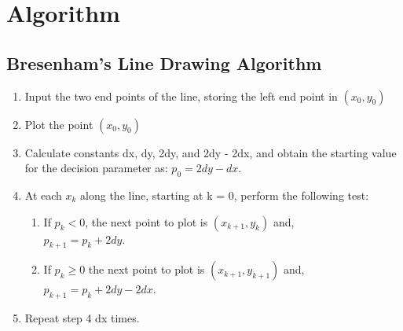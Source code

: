 \documentclass[12pt]{article}
\begin{document}
	\section{Algorithm}
	\subsection{Bresenham's Line Drawing Algorithm}
	\begin{enumerate}
		\item Input the two end points of the line, storing the left end point in $(x_0, y_0)$ 
		\item Plot the point $(x_0, y_0)$
		\item Calculate constants dx, dy, 2dy, and 2dy - 2dx, and obtain the starting value for the decision parameter as: $p_0 = 2dy - dx$.
		\item At each $x_k$ along the line, starting at k = 0, perform the following test:
		\begin{enumerate}
			\item If $p_k < 0$, the next point to plot is $(x_{k+1}, y_k)$ and,\\ $p_{k+1} = p_k + 2dy$.
			\item If $p_k \geq 0$ the next point to plot is $(x_{k+1}, y_{k+1})$ and,\\ $p_{k+1} = p_k + 2dy - 2dx$.
		\end{enumerate}
		\item Repeat step 4 dx times.
	\end{enumerate}
\end{document}
